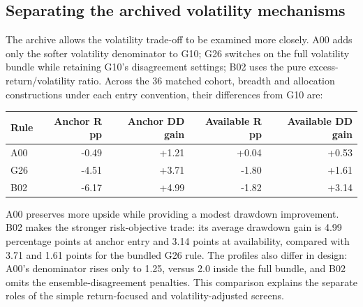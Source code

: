 \subsection{Separating the archived volatility mechanisms}

The archive allows the volatility trade-off to be examined more closely.
A00 adds only the softer volatility denominator to G10; G26 switches on
the full volatility bundle while retaining G10's disagreement settings;
B02 uses the pure excess-return/volatility ratio. Across the 36 matched
cohort, breadth and allocation constructions under each entry convention,
their differences from G10 are:

\begin{minipage}{\linewidth}
\begin{center}\small\setlength{\tabcolsep}{4pt}\renewcommand{\arraystretch}{1.18}
\begin{longtable}{@{}lrrrr@{}}\toprule
Rule & Anchor R pp & Anchor DD gain & Available R pp & Available DD gain\\\midrule\endhead
A00 & -0.49 & +1.21 & +0.04 & +0.53\\
G26 & -4.51 & +3.71 & -1.80 & +1.61\\
B02 & -6.17 & +4.99 & -1.82 & +3.14\\
\bottomrule\end{longtable}\end{center}
\end{minipage}\par

A00 preserves more upside while providing a modest drawdown improvement.
B02 makes the stronger risk-objective trade: its average drawdown gain is
4.99 percentage points at anchor entry and 3.14 points at availability,
compared with 3.71 and 1.61 points for the bundled G26 rule. The profiles
also differ in design: A00's denominator rises only to 1.25, versus 2.0
inside the full bundle, and B02 omits the ensemble-disagreement penalties.
This comparison explains the separate roles of the simple return-focused
and volatility-adjusted screens.
